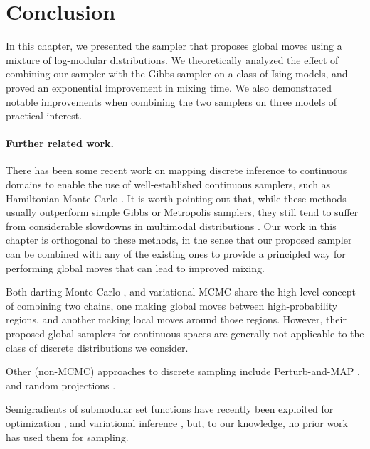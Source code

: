 \section{Conclusion}
In this chapter, we presented the \Ms{} sampler that proposes global moves using a mixture of log-modular distributions.
We theoretically analyzed the effect of combining our sampler with the Gibbs sampler on a class of Ising models, and proved an exponential improvement in mixing time.
We also demonstrated notable improvements when combining the two samplers on three models of practical interest.

\paragraph{Further related work.}
There has been some recent work on mapping discrete inference to continuous domains \citep{zhang12, pakman13, dinh17, nishimura18} to enable the use of well-established continuous samplers, such as Hamiltonian Monte Carlo \citep{neal12, betancourt17}.
It is worth pointing out that, while these methods usually outperform simple Gibbs or Metropolis samplers, they still tend to suffer from considerable slowdowns in multimodal distributions \citep{neal12}.
Our work in this chapter is orthogonal to these methods, in the sense that our proposed sampler can be combined with any of the existing ones to provide a principled way for performing global moves that can lead to improved mixing.

Both darting Monte Carlo \citep{sminchisescu07,ahn13}, and variational MCMC \citep{defreitas01} share the high-level concept of combining two chains, one making global moves between high-probability regions, and another making local moves around those regions.
However, their proposed global samplers for continuous spaces are generally not applicable to the class of discrete distributions we consider.

Other (non-MCMC) approaches to discrete sampling include Perturb-and-MAP \citep{papandreou11,hazan13}, and random projections \citep{zhu15}.

Semigradients of submodular set functions have recently been exploited for optimization \citep{iyer13, jegelka11}, and variational inference \citep{djolonga16}, but, to our knowledge, no prior work  has used them for sampling.